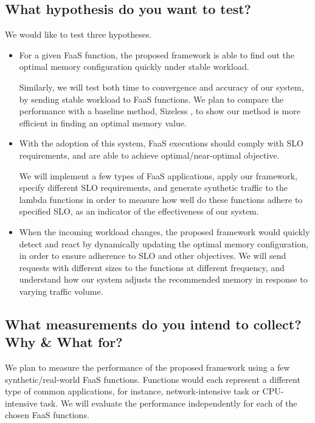 \documentclass[conference]{IEEEtran}
\begin{document}
\subsection{What hypothesis do you want to test?}
We would like to test three hypotheses.
\begin{itemize}
\item For a given FaaS function, the proposed framework is able to find out the optimal memory configuration quickly under stable workload.

Similarly, we will test both time to convergence and accuracy of our system, by sending stable workload to FaaS functions. We plan to compare the performance with a baseline method, Sizeless \cite{10.1145/3464298.3493398}, to show our method is more efficient in finding an optimal memory value.


\item With the adoption of this system, FaaS executions should comply with SLO requirements, and are able to achieve optimal/near-optimal objective.

We will implement a few types of FaaS applications, apply our framework, specify different SLO requirements, and generate synthetic traffic to the lambda functions in order to measure how well do these functions adhere to specified SLO, as an indicator of the effectiveness of our system.

\item When the incoming workload changes, the proposed framework would quickly detect and react by dynamically updating the optimal memory configuration, in order to ensure adherence to SLO and other objectives.
We will send requests with different sizes to the functions at different frequency, and understand how our system adjusts the recommended memory in response to varying traffic volume.
\end{itemize}

\subsection{What measurements do you intend to collect? Why \& What for?}

We plan to measure the performance of the proposed framework using a few synthetic/real-world FaaS functions. Functions would each represent a different type of common applications, for instance, network-intensive task or CPU-intensive task. We will evaluate the performance independently for each of the chosen FaaS functions. 
\end{document}
